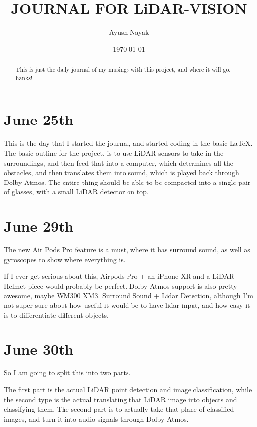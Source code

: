 \documentclass{article}
\begin{document}
\title{JOURNAL FOR LiDAR-VISION}
\author{Ayush Nayak}
\date{\today}

\maketitle

\begin{abstract}
    This is just the daily journal of my musings with this project, and where it will go. hanks!
\end{abstract}

\newpage

\section{June 25th}

This is the day that I started the journal, and started coding in the basic \LaTeX. The basic outline for the project, is to use LiDAR sensors to take in the surroundings, and then feed that into a computer, which determines all the obstacles, and then translates them into sound, which is played back through Dolby Atmos. The entire thing should be able to be compacted into a single pair of glasses, with a small LiDAR detector on top.

\section{June 29th}

The new Air Pods Pro feature is a must, where it has surround sound, as well as gyroscopes to show where everything is.

If I ever get serious about this, Airpods Pro + an iPhone XR and a LiDAR Helmet piece would probably be perfect. Dolby Atmos support is also pretty awesome, maybe WM300 XM3. Surround Sound + Lidar Detection, although I'm not super sure about how useful it would be to have lidar input, and how easy it is to differentiate different objects.

\section{June 30th}
So I am going to split this into two parts.

The first part is the actual LiDAR point detection and image classification, while the second type is the actual translating that LiDAR image into objects and classifying them. The second part is to actually take that plane of classified images, and turn it into audio signals through Dolby Atmos. 
\end{document}
